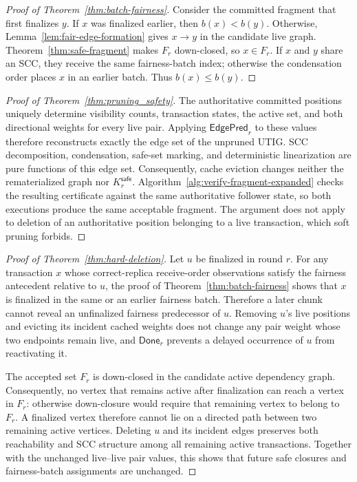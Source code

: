 \begin{proof}[Proof of Theorem~\ref{thm:batch-fairness}]
Consider the committed fragment that first finalizes $y$.  If $x$ was
finalized earlier, then $b(x)<b(y)$.  Otherwise,
Lemma~\ref{lem:fair-edge-formation} gives $x\to y$ in the candidate live
graph.  Theorem~\ref{thm:safe-fragment} makes $F_r$ down-closed, so
$x\in F_r$.  If $x$ and $y$ share an SCC, they receive the same fairness-batch
index; otherwise the condensation order places $x$ in an earlier batch.
Thus $b(x)\le b(y)$.
\end{proof}

\begin{proof}[Proof of Theorem~\ref{thm:pruning_safety}]
The authoritative committed positions uniquely determine visibility counts,
transaction states, the active set, and both directional weights for every
live pair.  Applying $\mathsf{EdgePred}_r$ to these values therefore reconstructs
exactly the edge set of the unpruned UTIG.  SCC decomposition, condensation,
safe-set marking, and deterministic linearization are pure functions of this
edge set.  Consequently, cache eviction changes neither the rematerialized
graph nor $K_r^{\mathsf{safe}}$.
Algorithm~\ref{alg:verify-fragment-expanded} checks the
resulting certificate against the same authoritative follower state, so both
executions produce the same acceptable fragment.  The argument does not apply
to deletion of an authoritative position belonging to a live transaction,
which soft pruning forbids.
\end{proof}

\begin{proof}[Proof of Theorem~\ref{thm:hard-deletion}]
Let $u$ be finalized in round $r$.  For any transaction $x$ whose
correct-replica receive-order observations satisfy the fairness antecedent
relative to $u$, the proof of
Theorem~\ref{thm:batch-fairness} shows that $x$ is finalized in the same or
an earlier fairness batch.  Therefore a later chunk cannot reveal an
unfinalized fairness predecessor of $u$.  Removing $u$'s live positions and
evicting its incident cached weights does not change any pair weight whose two
endpoints remain live, and $\mathsf{Done}_r$ prevents a delayed occurrence of $u$ from
reactivating it.

The accepted set $F_r$ is down-closed in the candidate active dependency graph.
Consequently, no vertex that remains active after finalization can reach a
vertex in $F_r$: otherwise down-closure would require that remaining vertex
to belong to $F_r$.  A finalized vertex therefore cannot lie on a directed
path between two remaining active vertices.  Deleting $u$ and its incident
edges preserves both reachability and SCC structure among all remaining
active transactions.  Together with the unchanged live--live pair values,
this shows that future safe closures and fairness-batch assignments are
unchanged.
\end{proof}

